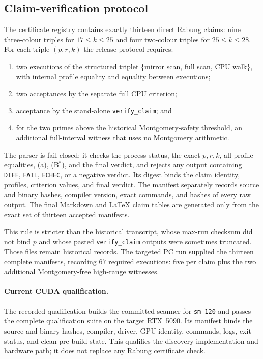 \subsection{Claim-verification protocol}\label{ss:protocol}

The certificate registry contains exactly thirteen direct Rabung
claims: nine three-colour triples for $17\le k\le25$ and four two-colour
triples for $25\le k\le28$.  For each triple $(p,r,k)$ the release protocol
requires:
\begin{enumerate}
\item two executions of the structured triplet \{mirror scan, full scan,
  CPU walk\}, with internal profile equality and equality between executions;
\item two acceptances by the separate full CPU criterion;
\item acceptance by the stand-alone \texttt{verify\_claim}; and
\item for the two primes above the historical Montgomery-safety threshold, an
  additional full-interval witness that uses no Montgomery arithmetic.
\end{enumerate}
The parser is fail-closed: it checks the process status, the exact $p,r,k$,
all profile equalities, (a), (B$^*$), and the final verdict, and rejects any
output containing \texttt{DIFF}, \texttt{FAIL}, \texttt{ECHEC}, or a negative
verdict.  Its digest binds the claim identity, profiles, criterion values, and
final verdict.  The manifest separately records source and binary hashes,
compiler version, exact commands, and hashes of every raw output.  The final
Markdown and \LaTeX{} claim tables are generated only from the exact set of
thirteen accepted manifests.

This rule is stricter than the historical transcript, whose max-run checksum
did not bind $p$ and whose pasted \texttt{verify\_claim} outputs were sometimes
truncated. Those files remain historical records. The targeted PC run
supplied the thirteen complete manifests, recording $67$ required executions: five per claim plus the
two additional Montgomery-free high-range witnesses.

\paragraph{Current CUDA qualification.}
The recorded qualification builds the committed scanner for \texttt{sm\_120}
and passes the complete qualification suite on the target RTX~5090.  Its
manifest binds the source and binary hashes, compiler, driver, GPU identity,
commands, logs, exit status, and clean pre-build state.  This qualifies the
discovery implementation and hardware path; it does not replace any Rabung
certificate check.

